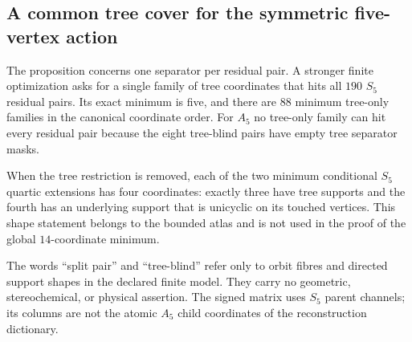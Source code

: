 \subsection{A common tree cover for the symmetric five-vertex action}

The proposition concerns one separator per residual pair.  A stronger finite
optimization asks for a single family of tree coordinates that hits all
$190$ $S_5$ residual pairs.  Its exact minimum is five, and there are $88$
minimum tree-only families in the canonical coordinate order.  For $A_5$ no
tree-only family can hit every residual pair because the eight tree-blind
pairs have empty tree separator masks.

When the tree restriction is removed, each of the two minimum conditional
$S_5$ quartic extensions has four coordinates: exactly three have tree
supports and the fourth has an underlying support that is unicyclic on its
touched vertices.  This shape statement belongs to the bounded atlas and is
not used in the proof of the global $14$-coordinate minimum.

\begin{proofboundary}
The words ``split pair'' and ``tree-blind'' refer only to orbit fibres and
directed support shapes in the declared finite model.  They carry no
geometric, stereochemical, or physical assertion.  The signed matrix uses
$S_5$ parent channels; its columns are not the atomic $A_5$ child coordinates
of the reconstruction dictionary.
\end{proofboundary}
